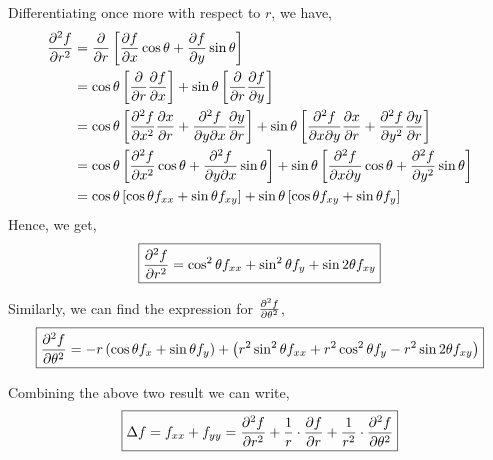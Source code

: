 \documentclass[../Analysis-3.tex]{subfiles}
\begin{document}
Differentiating once more with respect to $r$, we have,
\begin{align*}
    \pdv[2]{f}{r}
     & = \pdv{}{r} \left[\pdv{f}{x} \cos{\theta} + \pdv{f}{y} \sin{\theta} \right]                                                                                               \\
     & = \cos{\theta} \left[\pdv{}{r} \pdv{f}{x}\right] + \sin{\theta} \left[\pdv{}{r} \pdv{f}{y} \right]                                                                        \\
     & = \cos{\theta} \left[\pdv[2]{f}{x} \pdv{x}{r} + \pdv{f}{y}{x} \pdv{y}{r} \right] + \sin{\theta} \left[\pdv{f}{x}{y} \pdv{x}{r} + \pdv[2]{f}{y} \pdv{y}{r} \right]         \\
     & = \cos{\theta} \left[\pdv[2]{f}{x} \cos{\theta} + \pdv{f}{y}{x} \sin{\theta} \right] + \sin{\theta} \left[\pdv{f}{x}{y} \cos{\theta} + \pdv[2]{f}{y} \sin{\theta} \right] \\
     & = \cos{\theta} \left[\cos{\theta} f_{xx} + \sin{\theta} f_{xy} \right] + \sin{\theta} \left[\cos{\theta} f_{xy} + \sin{\theta} f_{y} \right]
\end{align*}
Hence, we get,
\[
    \boxed{\pdv[2]{f}{r} = \cos^2 \theta f_{xx} + \sin^2 \theta f_{y} + \sin 2 \theta f_{xy}}
\]


Similarly, we can find the expression for $\pdv[2]{f}{\theta}$,
\[
    \boxed{\pdv[2]{f}{\theta} = -r \left( \cos{\theta} f_x + \sin{\theta} f_y \right) + \left( r^2\sin^2 \theta f_{xx} + r^2\cos^2 \theta f_{y} - r^2\sin 2 \theta f_{xy} \right)}
\]

Combining the above two result we can write,
\[
    \boxed{\Delta f = f_{xx} + f_{yy} = \pdv[2]{f}{r} + \frac{1}{r}\cdot\pdv{f}{r} + \frac{1}{r^2}\cdot\pdv[2]{f}{\theta}}
\]
\end{document}
